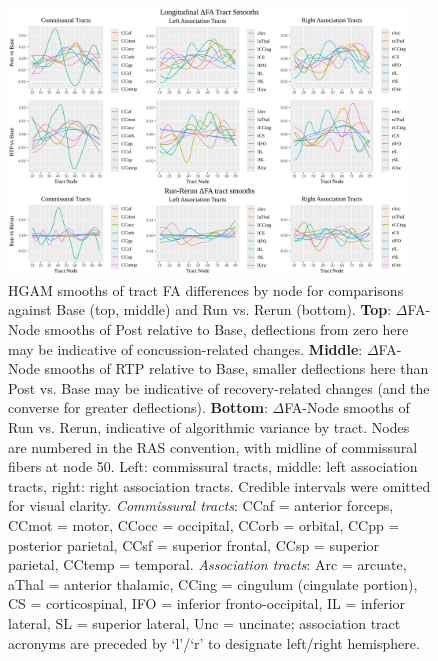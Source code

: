 \documentclass[12pt]{article}
\begin{document}
\begin{figure}[H]
	\centering
	\includegraphics[width=0.95\textwidth]{fit_LDI_DI_rerun.png}
	\caption{HGAM smooths of tract FA differences by node for comparisons against Base (top, middle) and Run vs. Rerun (bottom). \textbf{Top}: $\Delta$FA-Node smooths of Post relative to Base, deflections from zero here may be indicative of concussion-related changes. \textbf{Middle}: $\Delta$FA-Node smooths of RTP relative to Base, smaller deflections here than Post vs. Base may be indicative of recovery-related changes (and the converse for greater deflections). \textbf{Bottom}: $\Delta$FA-Node smooths of Run vs. Rerun, indicative of algorithmic variance by tract. Nodes are numbered in the RAS convention, with midline of commissural fibers at node 50. Left: commissural tracts, middle: left association tracts, right: right association tracts. Credible intervals were omitted for visual clarity. \textit{Commissural tracts}: CCaf = anterior forceps, CCmot = motor, CCocc = occipital, CCorb = orbital, CCpp = posterior parietal, CCsf = superior frontal, CCsp = superior parietal, CCtemp = temporal. \textit{Association tracts}: Arc = arcuate, aThal = anterior thalamic, CCing = cingulum (cingulate portion), CS = corticospinal, IFO = inferior fronto-occipital, IL = inferior lateral, SL = superior lateral, Unc = uncinate; association tract acronyms are preceded by `l'/`r' to designate left/right hemisphere.}
	\label{fig:ldi-gam}
\end{figure}
\end{document}
